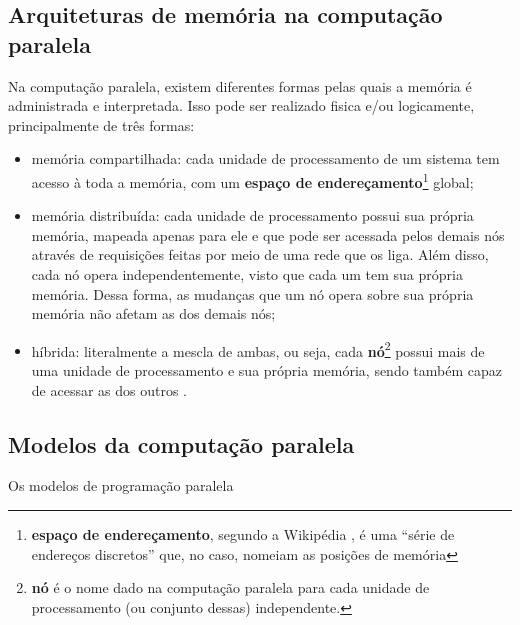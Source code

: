     \subsection{Arquiteturas de memória na computação paralela}
    
	    \label{subsec:memory-architectures}
	    
	    Na computação paralela, existem diferentes formas pelas quais a 
	    memória é administrada e interpretada. Isso pode ser realizado fisica 
	    e/ou logicamente, principalmente de três formas:
        \begin{itemize}
            \item memória compartilhada: cada unidade de processamento de
            um sistema tem acesso à toda a memória, com um \textbf{espaço de
            endereçamento}\footnote{\textbf{espaço de endereçamento}, segundo
            a Wikipédia \cite{wiki:address}, é uma ``série de endereços
            discretos'' que, no caso, nomeiam as posições de memória} global;
            
            \item memória distribuída: cada unidade de processamento possui
            sua própria memória, mapeada apenas para ele e que pode ser 
            acessada pelos demais nós através de requisições feitas por meio
            de uma rede que os liga. Além disso, cada nó opera
            independentemente, visto que cada um tem sua própria memória.
            Dessa forma, as mudanças que um nó opera sobre sua própria 
            memória não afetam as dos demais nós;
            
            \item híbrida: literalmente a mescla de ambas, ou seja, cada 
            \textbf{nó}\footnote{\textbf{nó} é o nome dado na computação 
            paralela para cada unidade de processamento (ou conjunto dessas) 
            independente.} possui mais de uma unidade de processamento e sua 
	        própria memória, sendo também capaz de acessar as dos outros 
	        \cite{LLNL:parcomp}.
        \end{itemize}
        
    
    \subsection{Modelos da computação paralela}
    
		\label{subsec:par-comp-models}
		Os modelos de programação paralela 
    
